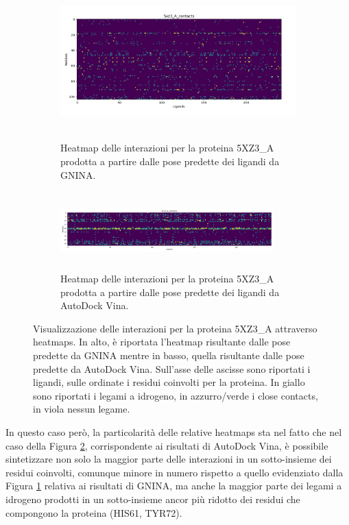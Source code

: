 \begin{figure}
    \centering
    \begin{subfigure}[b]{\textwidth}
        \centering
        \includegraphics[width=\textwidth, height=6cm]{images/chapter4/heatmaps/heatmap_gnina_5xz3_a.jpg}
        \caption[]%
        {{\small Heatmap delle interazioni per la proteina 5XZ3\_A prodotta a partire dalle pose predette dei ligandi da GNINA.}}    
        \label{fig:heatmap_gnina_5xz3_a}
    \end{subfigure}
    \hfill
    \begin{subfigure}[b]{\textwidth}  
        \centering 
        \includegraphics[width=0.9\textwidth, height=3cm]{images/chapter4/heatmaps/heatmap_vina_5xz3_a.jpg}
        \caption[]%
        {{\small Heatmap delle interazioni per la proteina 5XZ3\_A prodotta a partire dalle pose predette dei ligandi da AutoDock Vina.}}    
        \label{fig:heatmap_vina_5xz3_a}
    \end{subfigure}
    \caption[Visualizzazione delle heatmaps per la proteina 5XZ3\_A.]
    {\small Visualizzazione delle interazioni per la proteina 5XZ3\_A attraverso heatmaps. In alto, è riportata l'heatmap risultante dalle pose predette da GNINA mentre in basso, quella risultante dalle pose predette da AutoDock Vina. Sull'asse delle ascisse sono riportati i ligandi, sulle ordinate i residui coinvolti per la proteina. In giallo sono riportati i legami a idrogeno, in azzurro/verde i close contacts, in viola nessun legame. } 
    \label{fig:5xz3_a}
\end{figure}

In questo caso però, la particolarità delle relative heatmaps sta nel fatto che nel caso della Figura \ref{fig:heatmap_vina_5xz3_a}, corrispondente ai risultati di AutoDock Vina, è possibile sintetizzare non solo la maggior parte delle interazioni in un sotto-insieme dei residui coinvolti, comunque minore in numero rispetto a quello evidenziato dalla Figura \ref{fig:heatmap_gnina_5xz3_a} relativa ai risultati di GNINA, ma anche la maggior parte dei legami a idrogeno prodotti in un sotto-insieme ancor più ridotto dei residui che compongono la proteina (HIS61, TYR72).

